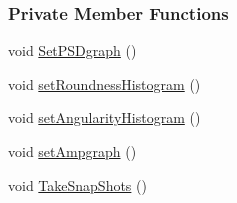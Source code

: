 \subsubsection*{Private Member Functions}
\begin{DoxyCompactItemize}
\item 
void \hyperlink{class_v_s_a_main_window_aded6489314d39f8071bf02b041ad81b3}{Set\+P\+S\+Dgraph} ()
\item 
void \hyperlink{class_v_s_a_main_window_ac574f6d81ce3ab1c7e78f00a95e24d9d}{set\+Roundness\+Histogram} ()
\item 
void \hyperlink{class_v_s_a_main_window_ab0063e1c86effb8e2b1bf2584f237669}{set\+Angularity\+Histogram} ()
\item 
void \hyperlink{class_v_s_a_main_window_a4de6c895ab070a8e4a9a858b819a7d1c}{set\+Ampgraph} ()
\item 
void \hyperlink{class_v_s_a_main_window_aed2fd5f5e0a932f8de7751d144ee74fe}{Take\+Snap\+Shots} ()
\end{DoxyCompactItemize}
